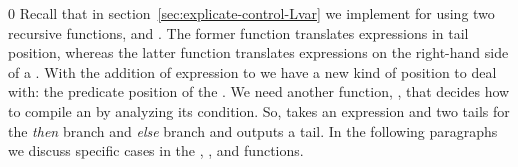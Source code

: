 \documentclass[7x10]{TimesAPriori_MIT}%
\def\racketEd{0}
\providecommand{\BookEdition}{1}
\let\edition\BookEdition
\numberwithin{theorem}{chapter}
\numberwithin{definition}{chapter}
\numberwithin{equation}{chapter}
\begin{document}
{\if\edition\racketEd        
%
Recall that in section~\ref{sec:explicate-control-Lvar} we implement
 for \LangVarANF{} using two recursive
functions,  and .  The
former function translates expressions in tail position, whereas the
latter function translates expressions on the right-hand side of a
. With the addition of  expression to \LangIfANF{} we
have a new kind of position to deal with: the predicate position of
the . We need another function, , that
decides how to compile an  by analyzing its condition.  So,
 takes an \LangIfANF{} expression and two
\LangCIf{} tails for the \emph{then} branch and \emph{else} branch
and outputs a tail.  In the following paragraphs we discuss specific
cases in the , , and
 functions.
%
\fi}
%
\end{document}
